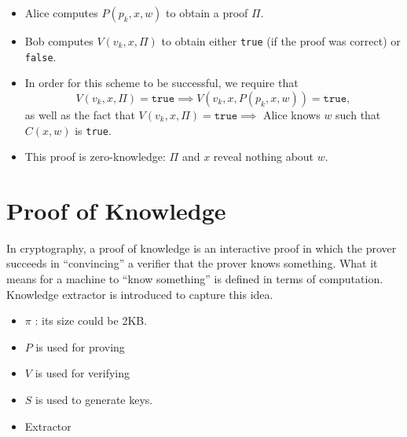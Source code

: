 \documentclass{article}
\begin{document}
\begin{itemize}
\begin{itemize}
	\item Alice computes $P(p_k, x, w)$ to obtain a proof $\Pi$.
	\item Bob computes $V(v_k, x, \Pi)$ to obtain either \texttt{true} (if the proof was correct) or \texttt{false}.
	\item In order for this scheme to be successful, we require that
		\begin{equation}
		V(v_k, x, \Pi) = \texttt{true} \implies V(v_k, x, P(p_k, x, w)) = \texttt{true},
		\end{equation}
		as well as the fact that $V(v_k, x, \Pi) = \texttt{true} \implies$ Alice knows $w$ such that $C(x, w)$ is \texttt{true}.
	\item This proof is zero-knowledge: $\Pi$ and $x$ reveal nothing about $w$.
	\end{itemize}
\end{itemize}





\section{Proof of Knowledge}
In cryptography, a proof of knowledge is an interactive proof in which the prover succeeds in ``convincing'' a verifier that the prover knows something. What it means for a machine to ``know something'' is defined in terms of computation. Knowledge extractor is introduced to capture this idea.
\begin{itemize}
    \item $\pi$ : its size could be 2KB.
    \item $P$ is used for proving
    \item $V$ is used for verifying
    \item $S$ is used to generate keys.
    \item Extractor


\end{itemize}
\end{document}
